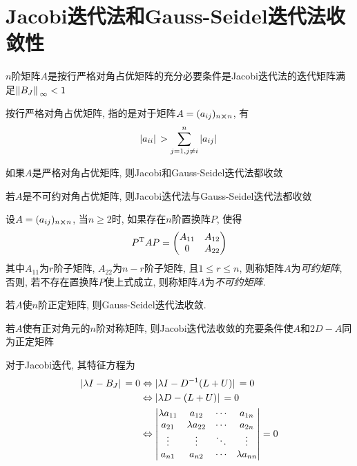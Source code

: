 \section{Jacobi迭代法和Gauss-Seidel迭代法收敛性}

\begin{theorem}
    $n$阶矩阵$A$是按行严格对角占优矩阵的充分必要条件是Jacobi迭代法的迭代矩阵满足$\norm*{B_J}_\infty<1$
\end{theorem}

按行严格对角占优矩阵, 指的是对于矩阵$A=(a_{ij})_{n\cross n}$, 有
\begin{equation*}
    \abs*{a_{ii}}>\sum_{j=1,j\ne i}^n\abs*{a_{ij}}
\end{equation*}

\begin{theorem}
    如果$A$是严格对角占优矩阵, 则Jacobi和Gauss-Seidel迭代法都收敛
\end{theorem}

\begin{theorem}
    若$A$是不可约对角占优矩阵, 则Jacobi迭代法与Gauss-Seidel迭代法都收敛
\end{theorem}

\begin{definition}[可约矩阵与不可约矩阵]
    设$A=(a_{ij})_{n\cross n}$, 当$n\ge2$时, 如果存在$n$阶置换阵$P$, 使得
    \begin{equation*}
        \transpose{P}AP=\mqty(
            A_{11}&A_{12}\\
            0&A_{22}
        )
    \end{equation*}
    其中$A_{11}$为$r$阶子矩阵, $A_{22}$为$n-r$阶子矩阵, 且$1\le r\le n$, 则称矩阵$A$为\emph{可约矩阵}, 否则, 若不存在置换阵$P$使上式成立, 则称矩阵$A$为\emph{不可约矩阵}.
\end{definition}

\begin{theorem}
    若$A$使$n$阶正定矩阵, 则Gauss-Seidel迭代法收敛.
\end{theorem}

\begin{theorem}
    若$A$使有正对角元的$n$阶对称矩阵, 则Jacobi迭代法收敛的充要条件使$A$和$2D-A$同为正定矩阵
\end{theorem}

对于Jacobi迭代, 其特征方程为
\begin{align*}
    \abs*{\lambda I-B_J}=0&\Leftrightarrow \abs*{\lambda I-\inv{D}(L+U)}=0\\
    &\Leftrightarrow\abs*{\lambda D-(L+U)}=0\\
    &\Leftrightarrow\mqty|
    \lambda a_{11} & a_{12}&\cdots&a_{1n}\\
    a_{21}&\lambda a_{22}&\cdots&a_{2n}\\
    \vdots&\vdots&\ddots&\vdots\\
    a_{n1}&a_{n2}&\cdots&\lambda a_{nn}|=0
\end{align*}


